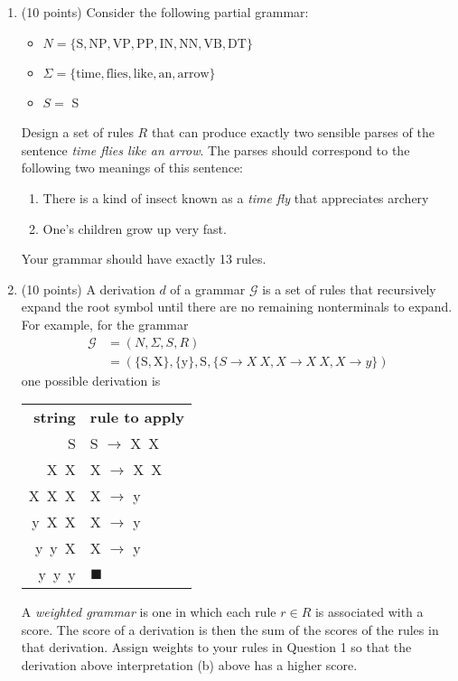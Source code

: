 \documentclass[12pt]{article}
\begin{document}
\begin{enumerate}
\item (10 points) Consider the following partial grammar:
\begin{itemize}
    \item $N = \{\mathrm{S,NP,VP,PP,IN,NN,VB,DT}\}$
    \item $\Sigma = \{\mathrm{time, flies, like, an, arrow}\}$
    \item $S=$ S
\end{itemize}

Design a set of rules $R$ that can produce exactly two sensible parses of the sentence \emph{time flies like an arrow}.
The parses should correspond to the following two meanings of this sentence:

\begin{enumerate}
    \item There is a kind of insect known as a \emph{time fly} that appreciates archery
    \item One's children grow up very fast.
\end{enumerate}

Your grammar should have exactly 13 rules.

\newpage
\item (10 points) A derivation $d$ of a grammar $\mathcal{G}$ is a set of rules that recursively expand the root symbol until there are no remaining nonterminals to expand.
For example, for the grammar
%
\begin{align}
\mathcal{G} & = (N, \Sigma, S, R) \\
  & = (\{\mathrm{S,X}\}, \{\mathrm{y}\}, \mathrm{S}, \{S\rightarrow X~X, X\rightarrow X~X, X\rightarrow y\})
\end{align}
%
one possible derivation is
%
\begin{table}[h]
    \centering
\begin{tabular}{rl}
    \textbf{string} & \textbf{rule to apply} \\
    S   &  S $\rightarrow$ X~X \\
    X~X &  X $\rightarrow$ X~X \\
    X~X~X &  X $\rightarrow$ y \\
    y~X~X &  X $\rightarrow$ y \\
    y~y~X &  X $\rightarrow$ y \\
    y~y~y &  $\blacksquare$ \\
\end{tabular}
\end{table}

A \emph{weighted grammar} is one in which each rule $r \in R$ is associated with a score. The score of a derivation is then the sum of the scores of the rules in that derivation.
Assign weights to your rules in Question 1 so that the derivation above interpretation (b) above has a higher score.

\end{enumerate}
\end{document}
